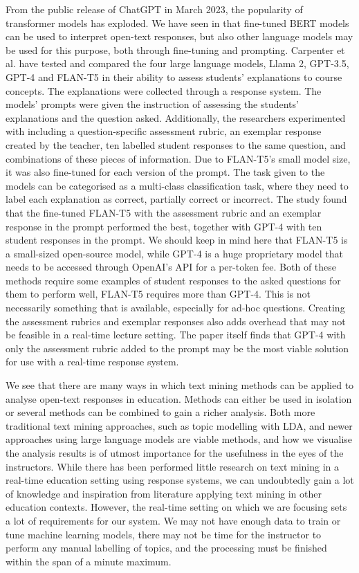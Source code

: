 From the public release of ChatGPT in March 2023, the popularity of transformer models has exploded. We have seen in \cite{setsum2022} that fine-tuned BERT models can be used to interpret open-text responses, but also other language models may be used for this purpose, both through fine-tuning and prompting. Carpenter et al. \cite{carpenter2024} have tested and compared the four large language models, Llama 2, GPT-3.5, GPT-4 and FLAN-T5 in their ability to assess students' explanations to course concepts. The explanations were collected through a response system. The models' prompts were given the instruction of assessing the students' explanations and the question asked. Additionally, the researchers experimented with including a question-specific assessment rubric, an exemplar response created by the teacher, ten labelled student responses to the same question, and combinations of these pieces of information. Due to FLAN-T5's small model size, it was also fine-tuned for each version of the prompt. The task given to the models can be categorised as a multi-class classification task, where they need to label each explanation as correct, partially correct or incorrect. The study found that the fine-tuned FLAN-T5 with the assessment rubric and an exemplar response in the prompt performed the best, together with GPT-4 with ten student responses in the prompt. We should keep in mind here that FLAN-T5 is a small-sized open-source model, while GPT-4 is a huge proprietary model that needs to be accessed through OpenAI's API for a per-token fee. Both of these methods require some examples of student responses to the asked questions for them to perform well, FLAN-T5 requires more than GPT-4. This is not necessarily something that is available, especially for ad-hoc questions. Creating the assessment rubrics and exemplar responses also adds overhead that may not be feasible in a real-time lecture setting. The paper itself finds that GPT-4 with only the assessment rubric added to the prompt may be the most viable solution for use with a real-time response system.

We see that there are many ways in which text mining methods can be applied to analyse open-text responses in education. Methods can either be used in isolation or several methods can be combined to gain a richer analysis. Both more traditional text mining approaches, such as topic modelling with LDA, and newer approaches using large language models are viable methods, and how we visualise the analysis results is of utmost importance for the usefulness in the eyes of the instructors. While there has been performed little research on text mining in a real-time education setting using response systems, we can undoubtedly gain a lot of knowledge and inspiration from literature applying text mining in other education contexts. However, the real-time setting on which we are focusing sets a lot of requirements for our system. We may not have enough data to train or tune machine learning models, there may not be time for the instructor to perform any manual labelling of topics, and the processing must be finished within the span of a minute maximum.



